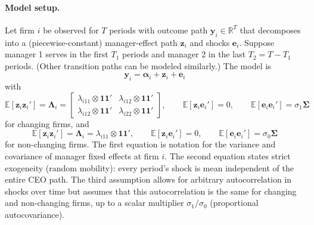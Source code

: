 \documentclass[11pt,a4paper]{article}
\begin{document}
\paragraph{Model setup.} Let firm $i$ be observed for $T$ periods with outcome path $\mathbf y_i\in\mathbb R^T$ that decomposes into a (piecewise-constant) manager-effect path $\mathbf z_i$ and shocks $\mathbf e_i$. Suppose manager 1 serves in the first $T_1$ periods and manager 2 in the last $T_2=T-T_1$ periods. (Other transition paths can be modeled similarly.) The model is
\begin{equation}
\mathbf y_i = \mathbf \alpha_i + \mathbf z_i + \mathbf e_i
\end{equation}
with 
\begin{equation}
\mathbb E[\mathbf z_i\mathbf z_i']= \mathbf \Lambda_i=
\begin{bmatrix}
  \lambda_{i11}\otimes \mathbf{11}' & \lambda_{i12}\otimes \mathbf{11}'\\
  \lambda_{i12}\otimes \mathbf{11}' & \lambda_{i22}\otimes \mathbf{11}'
\end{bmatrix},
\qquad \mathbb E[\mathbf z_i\mathbf e_i']=0,
\qquad \mathbb E[\mathbf e_i\mathbf e_i']=\sigma_1\mathbf\Sigma
\end{equation}
for changing firms, and 
\begin{equation}
\mathbb E[\mathbf z_i\mathbf z_i']= \mathbf \Lambda_i=
  \lambda_{i11}\otimes \mathbf{11}',
\qquad \mathbb E[\mathbf z_i\mathbf e_i']=0,
\qquad \mathbb E[\mathbf e_i\mathbf e_i']=\sigma_0\mathbf\Sigma
\end{equation}
for non-changing firms. The first equation is notation for the variance and covariance of manager fixed effects at firm $i$. The second equation states strict exogeneity (random mobility): every period's shock is mean independent of the entire CEO path. The third assumption allows for arbitrary autocorrelation in shocks over time but assumes that this autocorrelation is the same for changing and non-changing firms, up to a scalar multiplier $\sigma_1/\sigma_0$ (proportional autocovariance).
\end{document}
